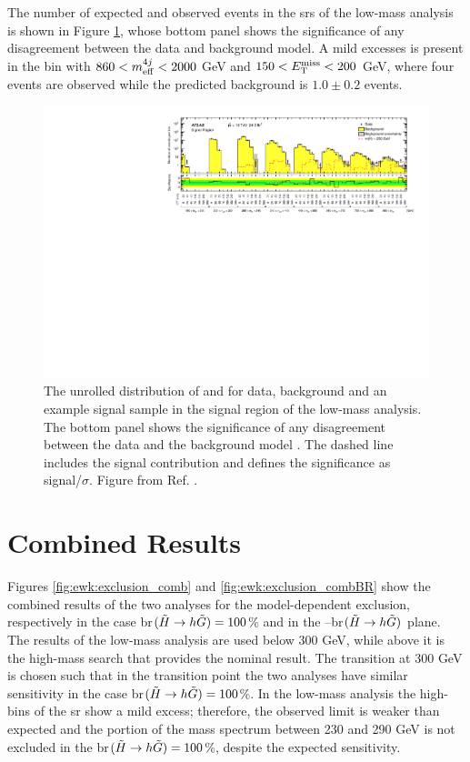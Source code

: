 The number of expected and observed events in the \glspl{sr} of the low-mass analysis 
is shown in Figure \ref{fig:btrig_bgModel_SR}, whose bottom panel shows the 
significance of any disagreement between the data and background model. 
A mild excesses is present in the bin with $860 < m_{\mathrm{eff}}^{4j} < 2000$ GeV and $150 < E_{\rm T}^{\mathrm{miss}} < 200$ GeV, where four events are observed 
while the predicted background is $1.0\pm 0.2$ events. 

\begin{figure}[!t]
\centering
\includegraphics[width=1\textwidth]{figures/ewk_prod/LM/Unroll_MEt_meff_signal.pdf}
\caption{The unrolled distribution of \met and \meffb for data, background and an example signal sample in the signal region of the low-mass analysis. 
The bottom panel shows the significance of any disagreement between the data and the background model \cite{Choudalakis:2011okv}. 
The dashed line includes the signal contribution and defines the significance as signal/$\sigma$. 
Figure from Ref. \cite{Aaboud:2018htj}. 
}
\label{fig:btrig_bgModel_SR}
\end{figure}


\section{Combined Results}
\label{sec:ewk:HMLM}

Figures \ref{fig:ewk:exclusion_comb} and \ref{fig:ewk:exclusion_combBR} show the combined results of the two analyses for the model-dependent 
exclusion, respectively in the case \gls{br}$(\tilde{H}\rightarrow h \tilde{G})=100$\% and in the \mhino--\gls{br}$(\tilde{H}\rightarrow h \tilde{G})$ plane.
The results of the low-mass analysis are used below 300 GeV, while above it is the high-mass search that provides the nominal result.
The transition at 300 GeV is chosen such that in the transition point the two analyses have 
similar sensitivity in the case \gls{br}$(\tilde{H}\rightarrow h \tilde{G})=100$\%.
In the low-mass analysis the high-\met bins of the \gls{sr} show a mild excess; 
therefore, the observed limit is weaker than expected and the portion of the mass spectrum between 230 and 290 GeV is not excluded in the 
\gls{br}$(\tilde{H}\rightarrow h \tilde{G})=100$\%, despite the expected sensitivity. 

